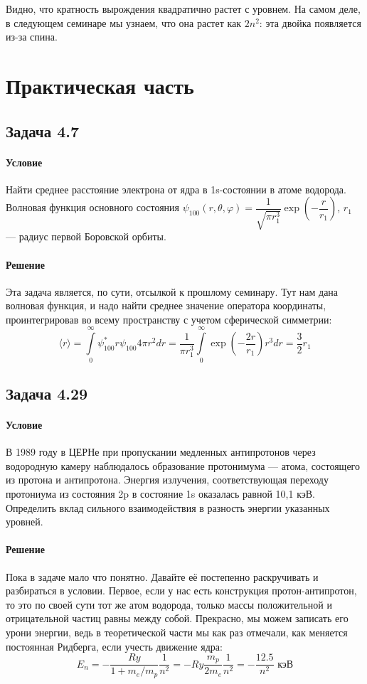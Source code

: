 \documentclass[12pt]{article}
\begin{document}
\noindent
Видно, что кратность вырождения квадратично растет с уровнем. На самом деле, в следующем семинаре мы узнаем, что она растет как $2n^2$: эта двойка появляется из-за спина.

\section{Практическая часть}
\subsection{Задача 4.7}
\label{task_4.7}
\paragraph{Условие} Найти среднее расстояние электрона от ядра в 1s-состоянии в атоме водорода. Волновая функция основного состояния $\psi_{100}(r, \theta, \varphi) = \dfrac{1}{\sqrt{\pi r_1^3}}\exp{\left(-\dfrac{r}{r_1} \right)}$, $r_1$ --- радиус первой Боровской орбиты.
\paragraph{Решение}
Эта задача является, по сути, отсылкой к прошлому семинару. Тут нам дана волновая функция, и надо найти среднее значение оператора координаты, проинтегрировав во всему пространству с учетом сферической симметрии:
\begin{equation}
    \langle r\rangle = \int\limits_0^{\infty} \psi^*_{100} r \psi_{100} 4\pi r^2 dr =\dfrac{1}{\pi r_1^3}\int\limits_0^{\infty} \exp{\left(- \dfrac{2r}{r_1} \right)} r^3 dr = \dfrac{3}{2}r_1
\end{equation}

\subsection{Задача 4.29}
\label{task_4.29}
\paragraph{Условие} В 1989 году в ЦЕРНе при пропускании медленных антипротонов через водородную камеру наблюдалось образование протонимума --- атома, состоящего из протона и антипротона. Энергия излучения, соответствующая переходу протониума из состояния 2p в состояние 1s оказалась равной 10,1 кэВ. Определить вклад сильного взаимодействия в разность энергии указанных уровней.
\paragraph{Решение}
Пока в задаче мало что понятно. Давайте её постепенно раскручивать и разбираться в условии. Первое, если у нас есть конструкция протон-антипротон, то это по своей сути тот же атом водорода, только массы положительной и отрицательной частиц равны между собой. Прекрасно, мы можем записать его урони энергии, ведь в теоретической части мы как раз отмечали, как меняется постоянная Ридберга, если учесть движение ядра:
\begin{equation*}
    E_n = - \dfrac{Ry}{1+m_e/m_p}\dfrac{1}{n^2} = -Ry\dfrac{m_p}{2m_e} \dfrac{1}{n^2} = -\dfrac{12.5}{n^2} \text{ кэВ}
\end{equation*}
\end{document}
